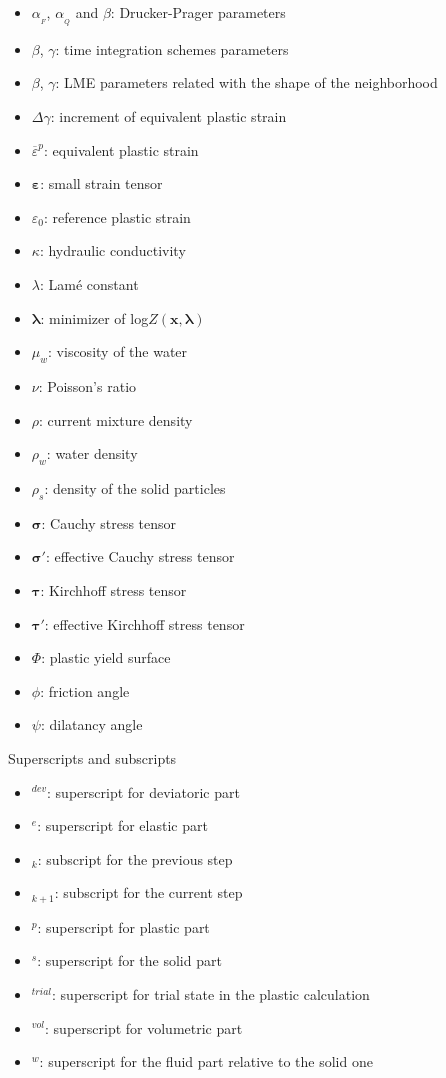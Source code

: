 \documentclass[twocolumn]{svjour3}          %
\begin{document}
\begin{itemize}
\item $\alpha_{_F}$, $\alpha_{_Q}$ and $\beta$: Drucker-Prager parameters
\item $\beta$, $\gamma$: time integration schemes parameters
\item $\beta$, $\gamma$: LME parameters related with the shape of the neighborhood
\item $\Delta\gamma$: increment of equivalent plastic strain
\item $\overline{\varepsilon}^p$: equivalent plastic strain
\item $\boldsymbol{\varepsilon}$: small strain tensor
\item  $\varepsilon_0$: reference plastic strain
\item $\kappa$: hydraulic conductivity
\item $\lambda$: Lam\'e constant
\item $\boldsymbol{\lambda}$: minimizer of log$Z(\boldsymbol{x},\boldsymbol{\lambda})$
\item  $\mu_w $: viscosity of the water
\item $\nu$: Poisson's ratio
\item $\rho$: current mixture density
\item $\rho_w$: water density
\item $\rho_s$: density of the solid particles
\item $\boldsymbol{\sigma}$: Cauchy stress tensor
\item $\boldsymbol{\sigma'}$: effective Cauchy stress tensor
\item $\boldsymbol{\tau}$: Kirchhoff stress tensor
\item $\boldsymbol{\tau'}$: effective Kirchhoff stress tensor
\item $\Phi$: plastic yield surface
\item  $\phi$: friction angle
\item $\psi$: dilatancy angle
\\
\end{itemize}

Superscripts and subscripts
\begin{itemize}
\item$^{dev}$: superscript for deviatoric part
\item$^{e}$: superscript for elastic part
\item$_{k}$: subscript for the previous step
\item$_{k+1}$: subscript for the current step
\item$^{p}$: superscript for plastic part
\item$^{s}$: superscript for the solid part
\item$^{trial}$: superscript for trial state in the plastic calculation
\item$^{vol}$: superscript for volumetric part
\item$^{w}$: superscript for the fluid part relative to the solid one
\end{itemize}

\end{document}
